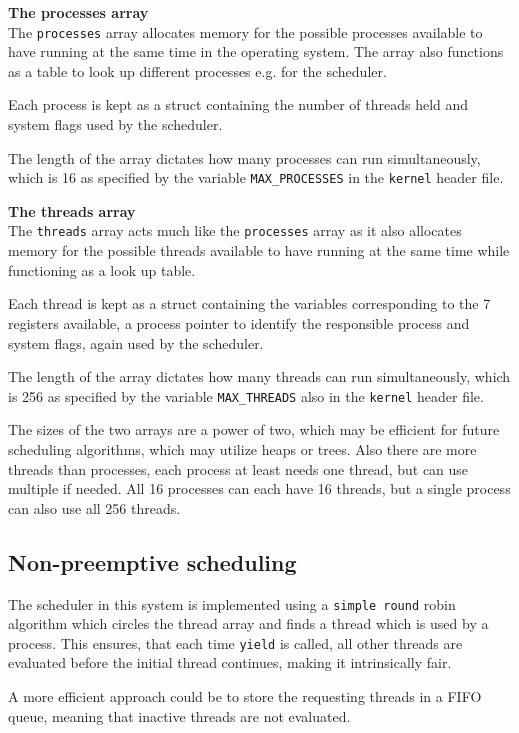 \textbf{The processes array} \\
The \texttt{processes} array allocates memory for the possible processes available to have running at the same time in the operating system. The array also functions as a table to look up different processes e.g. for the scheduler. 

Each process is kept as a struct containing the number of threads held and system flags used by the scheduler. 

The length of the array dictates how many processes can run simultaneously, which is 16 as specified by the variable \texttt{MAX\_PROCESSES} in the \texttt{kernel} header file.

\textbf{The threads array} \\
The \texttt{threads} array acts much like the \texttt{processes} array as it also allocates memory for the possible threads available to have running at the same time while functioning as a look up table.

Each thread is kept as a struct containing the variables corresponding to the 7 registers available, a process pointer to identify the responsible process and system flags, again used by the scheduler.

The length of the array dictates how many threads can run simultaneously, which is 256 as specified by the variable \texttt{MAX\_THREADS} also in the \texttt{kernel} header file.

The sizes of the two arrays are a power of two, which may be efficient for future scheduling algorithms, which may utilize heaps or trees. Also there are more threads than processes, each process at least needs one thread, but can use multiple if needed. All 16 processes can each have 16 threads, but a single process can also use all 256 threads.

\subsection{Non-preemptive scheduling}
The scheduler in this system is implemented using a \texttt{simple round} robin algorithm which circles the thread array and finds a thread which is used by a process. This ensures, that each time \texttt{yield} is called, all other threads are evaluated before the initial thread continues, making it intrinsically fair. 

A more efficient approach could be to store the requesting threads in a FIFO queue, meaning that inactive threads are not evaluated.


